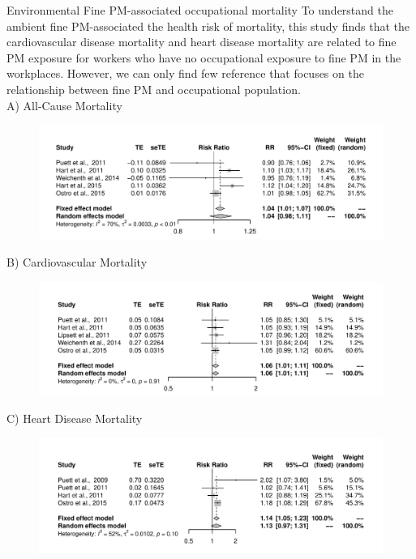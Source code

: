 \documentclass[final,t]{beamer}
\begin{document}
\begin{frame}[fragile]
\begin{columns}[t]
    \begin{column}{0.36\linewidth}
      \begin{block}{Environmental Fine PM-associated occupational mortality}
      To understand the ambient fine PM-associated the health risk of mortality, this study finds that the cardiovascular disease mortality and heart disease mortality are related to fine PM exposure for workers who have no occupational exposure to fine PM in the workplaces. However, we can only find few reference that focuses on the relationship between fine PM and occupational population.
      \vspace{5mm}
      \\
      {\large A) All-Cause Mortality}\\
      \begin{figure}[htb]
      \includegraphics[width=.95\columnwidth]{fig5}
      \end{figure}
      {\large B) Cardiovascular Mortality}\\
      \begin{figure}[htb]
      \includegraphics[width=.95\columnwidth]{fig6}
      \end{figure}
      {\large C) Heart Disease Mortality}\\
      \begin{figure}[htb]
      \includegraphics[width=.95\columnwidth]{fig7}
      \end{figure}
      \end{block}
      

\end{column}
\end{columns}
\end{frame}
\end{document}
